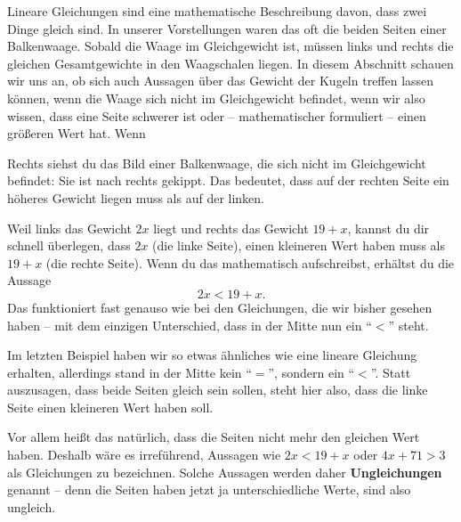 \documentclass[../../main.tex]{subfiles}
\begin{document}
Lineare Gleichungen sind eine mathematische Beschreibung davon, dass zwei Dinge gleich sind. In unserer Vorstellungen waren das oft die beiden Seiten einer Balkenwaage. Sobald die Waage im Gleichgewicht ist, müssen links und rechts die gleichen Gesamtgewichte in den Waagschalen liegen. In diesem Abschnitt schauen wir uns an, ob sich auch Aussagen über das Gewicht der Kugeln treffen lassen können, wenn die Waage sich nicht im Gleichgewicht befindet, wenn wir also wissen, dass eine Seite schwerer ist oder -- mathematischer formuliert -- einen größeren Wert hat.
Wenn 
\begin{example}{}
    
    Rechts siehst du das Bild einer Balkenwaage, die sich nicht im Gleichgewicht befindet: Sie ist nach rechts gekippt. Das bedeutet, dass auf der rechten Seite ein höheres Gewicht liegen muss als auf der linken.
    
    Weil links das Gewicht $2x$ liegt und rechts das Gewicht $19+x$, kannst du dir schnell überlegen, dass $2x$ (die linke Seite), einen kleineren Wert haben muss als $19+x$ (die rechte Seite). Wenn du das mathematisch aufschreibst, erhältst du die Aussage
    \[2x<19+x.\]
    Das funktioniert fast genauso wie bei den Gleichungen, die wir bisher gesehen haben -- mit dem einzigen Unterschied, dass in der Mitte nun ein \enquote{$<$} steht.
\end{example}

Im letzten Beispiel haben wir so etwas ähnliches wie eine lineare Gleichung erhalten, allerdings stand in der Mitte kein \enquote{$=$}, sondern ein \enquote{$<$}. Statt auszusagen, dass beide Seiten gleich sein sollen, steht hier also, dass die linke Seite einen kleineren Wert haben soll. 

Vor allem heißt das natürlich, dass die Seiten nicht mehr den gleichen Wert haben. Deshalb wäre es irreführend, Aussagen wie $2x<19+x$ oder $4x+71>3$ als Gleichungen zu bezeichnen. Solche Aussagen werden daher \textbf{Ungleichungen} genannt -- denn die Seiten haben jetzt ja unterschiedliche Werte, sind also ungleich.
\end{document}
